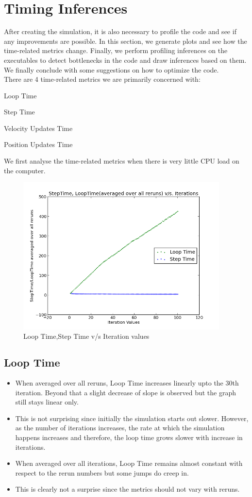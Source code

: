 \documentclass[11pt]{article}
\begin{document}
\section{Timing Inferences}
After creating the simulation, it is also necessary to profile the code and see if any improvements are possible. In this section, we generate plots and see how the time-related metrics change.
Finally, we perform profiling inferences on the executables to detect bottlenecks in the code and draw inferences based on them. We finally conclude with some suggestions on how to optimize the code. \\
There are 4 time-related metrics we are primarily concerned with:

 Loop Time
 
 Step Time
 
 Velocity Updates Time
 
 Position Updates Time


We first analyse the time-related metrics when there is very little CPU load on the computer.

\begin{figure}[h!]
\caption{Loop Time,Step Time v/s Iteration values}
\centering
\includegraphics[height=8cm]{images/g19_proj_plot01}
\end{figure}

\subsection{Loop Time}



\begin{itemize}
	\item When averaged over all reruns, Loop Time increases linearly upto the 30th iteration. Beyond that a slight decrease of slope is observed but the graph still stays linear only. 
	\item This is not surprising since initially the simulation starts out slower. However, as the number of iterations increases, the rate at which the simulation happens increases and therefore, the loop time grows slower with increase in iterations.
	\item When averaged over all iterations, Loop Time remains almost constant with respect to the rerun numbers but some jumps do creep in.
	\item This is clearly not a surprise since the metrics should not vary with reruns.	
\end{itemize}
\end{document}

